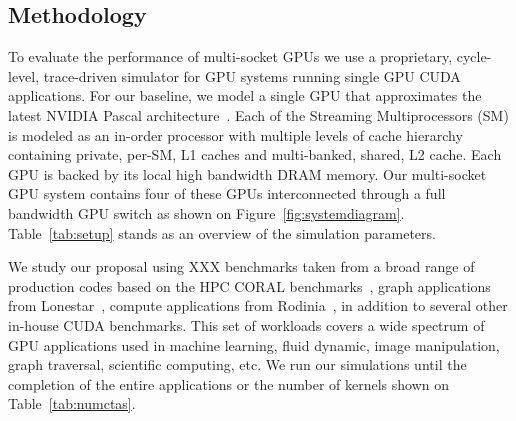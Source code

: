 \subsection{Methodology}
\label{methodology}
 To evaluate the performance of multi-socket GPUs we use a proprietary, 
cycle-level, trace-driven simulator for GPU systems running single GPU CUDA 
applications. For our baseline, we model a single GPU that approximates the 
latest NVIDIA Pascal architecture~\cite{inside-pascal}. Each of the Streaming 
Multiprocessors (SM) is modeled as an in-order processor with multiple levels of cache hierarchy 
containing private, per-SM, L1 caches and multi-banked, shared, L2 cache. Each 
GPU is backed by its local high bandwidth DRAM memory. Our multi-socket GPU 
system contains four of these GPUs interconnected through a full bandwidth GPU 
switch as shown on Figure~\ref{fig:systemdiagram}. Table~\ref{tab:setup} stands as an overview of the simulation parameters.

We study our proposal using XXX benchmarks taken from a broad range of 
production codes based on the HPC CORAL benchmarks~\cite{coral}, graph 
applications from Lonestar~\cite{lonestar}, compute applications from 
Rodinia~\cite{Che2009}, in addition to several other in-house CUDA benchmarks. 
This set of workloads covers a wide spectrum of GPU applications used in machine 
learning, fluid dynamic, image manipulation, graph traversal, scientific 
computing, etc. We run our simulations until the completion of the entire 
applications or the number of kernels shown on Table~\ref{tab:numctas}.

